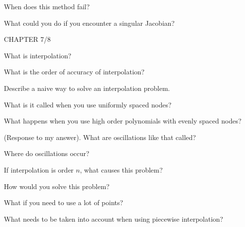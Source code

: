 \documentclass[12pt]{article}
\newenvironment{problem}[2][Problem]{\begin{trivlist}
\item[\hskip \labelsep {\bfseries #1}\hskip \labelsep {\bfseries #2.}]}{\end{trivlist}}
\begin{document}
\begin{problem}{}
When does this method fail?
\end{problem}

\begin{problem}{}
What could you do if you encounter a singular Jacobian?
\end{problem}

CHAPTER 7/8

\begin{problem}{}
What is interpolation?
\end{problem}

\begin{problem}{}
What is the order of accuracy of interpolation?
\end{problem}

\begin{problem}{}
Describe a naive way to solve an interpolation problem.
\end{problem}

\begin{problem}{}
What is it called when you use uniformly spaced nodes?
\end{problem}

\begin{problem}{}
What happens when you use high order polynomials with evenly spaced nodes?
\end{problem}

\begin{problem}{}
(Response to my answer).  What are oscillations like that called?
\end{problem}

\begin{problem}{}
Where do oscillations occur?
\end{problem}

\begin{problem}{}
If interpolation is order $n$, what causes this problem?
\end{problem}

\begin{problem}{}
How would you solve this problem?
\end{problem}

\begin{problem}{}
What if you need to use a lot of points?
\end{problem}

\begin{problem}{}
What needs to be taken into account when using piecewise interpolation?
\end{problem}
\end{document}
